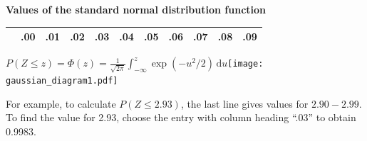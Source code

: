\documentclass[a4paper]{article}
\begin{document}
\begin{center}
  {\Large\bf Values of the standard normal distribution function}
\end{center}

\rule{0mm}{5mm}
\pagestyle{empty}
\thispagestyle{empty}
\begin{table}[ht]
\centering
\begin{tabular}{r|llllllllll}
  \hline \rule{0mm}{4mm}
  & {\large .00} & {\large .01} & {\large .02} & {\large .03} & {\large .04}
  & {\large .05} & {\large .06} & {\large .07} & {\large .08} & {\large .09}
  \vphantom{$y_{y_{y_y}}$} \\  \hline

  \hline
\end{tabular}
\end{table}

\noindent
\(\displaystyle P(Z\leqslant z)=\Phi(z)=\frac{1}{\sqrt{2\pi}}\int_{-\infty}^z\exp\left(-u^2/2\right)\,\mathrm{d}u\)\hfill\hbox{\texttt{[image: gaussian\_diagram1.pdf]}}

\noindent For example, to calculate \(P(Z\leqslant 2.93)\), the last
line gives values for \(2.90-2.99\).  To find the value for 2.93,
choose the entry with column heading ``.03'' to obtain 0.9983.\\ \\



\end{document}
